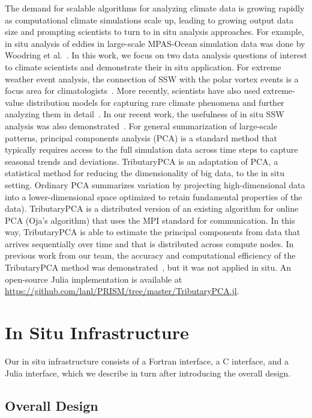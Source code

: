 \documentclass{juliacon}
\begin{document}
The demand for scalable algorithms for analyzing climate data is growing rapidly as computational climate simulations scale up, leading to growing output data size and prompting scientists to turn to in situ analysis approaches. For example, in situ analysis of eddies in large-scale MPAS-Ocean simulation data was done by Woodring et al.~\cite{7192723}. In this work, we focus on two data analysis questions of interest to climate scientists and demonstrate their in situ application. For extreme weather event analysis, the connection of SSW with the polar vortex events is a focus area for climatologists~\cite{ssw_survey}. More recently, scientists have also used extreme-value distribution models for capturing rare climate phenomena and further analyzing them in detail~\cite{gev_huang2016estimating, gev_wang2017detection}. In our recent work, the usefulness of in situ SSW analysis was also demonstrated~\cite{ssw_isav}.
For general summarization of large-scale patterns, principal components analysis (PCA) is a standard method that typically requires access to the full simulation data across time steps to capture seasonal trends and deviations.
TributaryPCA is an adaptation of PCA, a statistical method for reducing the dimensionality of big data, to the in situ setting. Ordinary PCA summarizes variation by projecting high-dimensional data into a lower-dimensional space optimized to retain fundamental properties of the data). TributaryPCA is a distributed version of an existing algorithm for online PCA (Oja's algorithm) that uses the MPI standard for communication. In this way, TributaryPCA is able to estimate the principal components from data that arrives sequentially over time and that is distributed across compute nodes. In previous work from our team, the accuracy and computational efficiency of the TributaryPCA method was demonstrated~\cite{wang2021tributarypca}, but it was not applied in situ. An open-source Julia implementation is available at \url{https://github.com/lanl/PRISM/tree/master/TributaryPCA.jl}.




\section{In Situ Infrastructure}
Our in situ infrastructure consists of a Fortran interface, a C interface, and a Julia interface, which we describe in turn after introducing the overall design.

\subsection{Overall Design}
\end{document}
